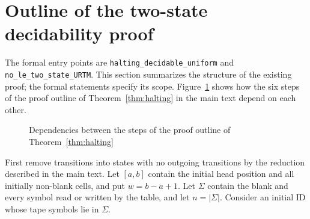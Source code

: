 \section{Outline of the two-state decidability proof}

The formal entry points are \texttt{halting\_decidable\_uniform} and
\texttt{no\_le\_two\_state\_URTM}. This section summarizes the structure
of the existing proof; the formal statements specify its scope.
Figure~\ref{fig:halting-steps} shows how the six steps of the proof outline of
Theorem~\ref{thm:halting} in the main text depend on each other.

\begin{figure}[tb]
\centering
{}
\caption{Dependencies between the steps of the proof outline of Theorem~\ref{thm:halting}}
\label{fig:halting-steps}
\end{figure}


First remove transitions into states with no outgoing transitions by the
reduction described in the main text. Let $[a,b]$ contain the initial head
position and all initially non-blank cells, and put $w=b-a+1$.
Let $\Sigma$ contain the blank and every symbol read or written by the
table, and let $n=|\Sigma|$. Consider an initial ID whose tape symbols
lie in $\Sigma$.


